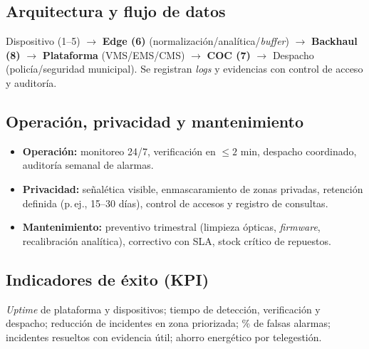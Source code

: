 \documentclass[12pt,a4paper]{article}
\begin{document}
\subsection{Arquitectura y flujo de datos}
Dispositivo (1--5) \(\rightarrow\) \textbf{Edge (6)} (normalización/analítica/\textit{buffer}) \(\rightarrow\) \textbf{Backhaul (8)} \(\rightarrow\) \textbf{Plataforma} (VMS/EMS/CMS) \(\rightarrow\) \textbf{COC (7)} \(\rightarrow\) Despacho (policía/seguridad municipal). Se registran \textit{logs} y evidencias con control de acceso y auditoría.

\subsection{Operación, privacidad y mantenimiento}
\begin{itemize}
  \item \textbf{Operación:} monitoreo 24/7, verificación en \(\leq 2\) min, despacho coordinado, auditoría semanal de alarmas.
  \item \textbf{Privacidad:} señalética visible, enmascaramiento de zonas privadas, retención definida (p.\,ej., 15--30 días), control de accesos y registro de consultas.
  \item \textbf{Mantenimiento:} preventivo trimestral (limpieza ópticas, \textit{firmware}, recalibración analítica), correctivo con SLA, stock crítico de repuestos.
\end{itemize}

\subsection{Indicadores de éxito (KPI)}
\noindent \textit{Uptime} de plataforma y dispositivos; tiempo de detección, verificación y despacho; reducción de incidentes en zona priorizada; \% de falsas alarmas; incidentes resueltos con evidencia útil; ahorro energético por telegestión.
\end{document}

